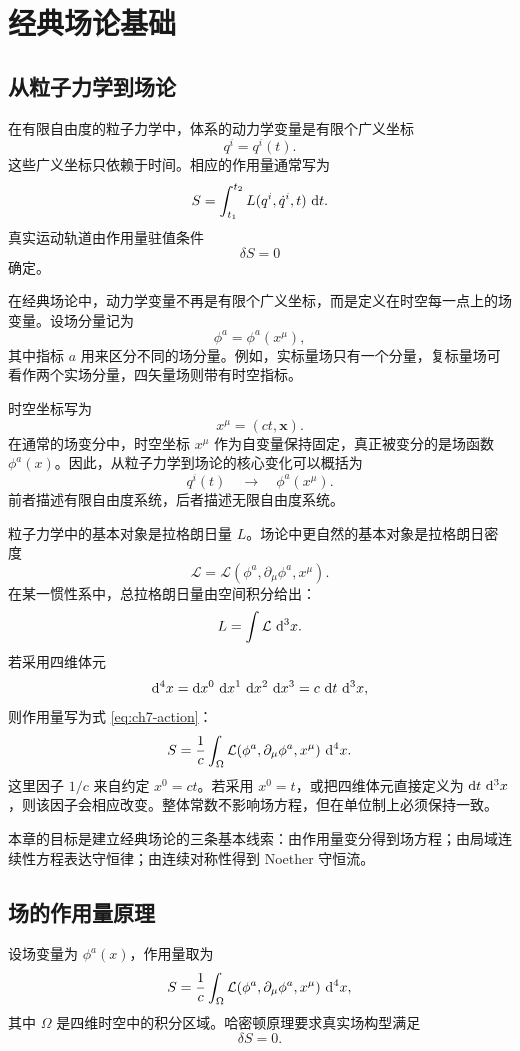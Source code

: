 \chapter{经典场论基础}

\section{从粒子力学到场论}

在有限自由度的粒子力学中，体系的动力学变量是有限个广义坐标
\[
q^{i}=q^{i}(t).
\]
这些广义坐标只依赖于时间。相应的作用量通常写为
\[
S=\int_{t_{1}}^{t_{2}}L(q^{i},\dot q^{i},t)\,\mathop{}\!\mathrm{d} t.
\]
真实运动轨道由作用量驻值条件
\[
\delta S=0
\]
确定。

在经典场论中，动力学变量不再是有限个广义坐标，而是定义在时空每一点上的场变量。设场分量记为
\[
\phi^{a}=\phi^{a}(x^{\mu}),
\]
其中指标 $a$ 用来区分不同的场分量。例如，实标量场只有一个分量，复标量场可看作两个实场分量，四矢量场则带有时空指标。

时空坐标写为
\[
x^{\mu}=(ct,\bm{x}).
\]
在通常的场变分中，时空坐标 $x^{\mu}$ 作为自变量保持固定，真正被变分的是场函数 $\phi^{a}(x)$。因此，从粒子力学到场论的核心变化可以概括为
\[
q^{i}(t)
\quad\longrightarrow\quad
\phi^{a}(x^{\mu}).
\]
前者描述有限自由度系统，后者描述无限自由度系统。

粒子力学中的基本对象是拉格朗日量 $L$。场论中更自然的基本对象是拉格朗日密度
\[
\mathcal{L}=\mathcal{L}(\phi^{a},\partial_{\mu}\phi^{a},x^{\mu}).
\]
在某一惯性系中，总拉格朗日量由空间积分给出：
\[
L=\int \mathcal{L}\,\mathop{}\!\mathrm{d}^{3}x.
\]
若采用四维体元
\[
\mathop{}\!\mathrm{d}^{4}x=\mathop{}\!\mathrm{d} x^{0}\,\mathop{}\!\mathrm{d} x^{1}\,\mathop{}\!\mathrm{d} x^{2}\,\mathop{}\!\mathrm{d} x^{3}=c\,\mathop{}\!\mathrm{d} t\,\mathop{}\!\mathrm{d}^{3}x,
\]
则作用量写为式 \eqref{eq:ch7-action}：
\begin{equation}
	S=\frac{1}{c}\int_{\Omega}\mathcal{L}(\phi^{a},\partial_{\mu}\phi^{a},x^{\mu})\,\mathop{}\!\mathrm{d}^{4}x.
	\label{eq:ch7-action}
\end{equation}
这里因子 $1/c$ 来自约定 $x^{0}=ct$。若采用 $x^{0}=t$，或把四维体元直接定义为 $\mathop{}\!\mathrm{d} t\,\mathop{}\!\mathrm{d}^{3}x$，则该因子会相应改变。整体常数不影响场方程，但在单位制上必须保持一致。

本章的目标是建立经典场论的三条基本线索：由作用量变分得到场方程；由局域连续性方程表达守恒律；由连续对称性得到 Noether 守恒流。

\section{场的作用量原理}

设场变量为 $\phi^{a}(x)$，作用量取为
\[
S=\frac{1}{c}\int_{\Omega}
\mathcal{L}(\phi^{a},\partial_{\mu}\phi^{a},x^{\mu})\,\mathop{}\!\mathrm{d}^{4}x,
\]
其中 $\Omega$ 是四维时空中的积分区域。哈密顿原理要求真实场构型满足
\begin{equation}
	\delta S=0.
	\label{eq:ch7-stationary-action}
\end{equation}

